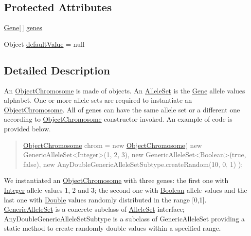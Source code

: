 \subsection*{Protected Attributes}
\begin{DoxyCompactItemize}
\item 
\hyperlink{classjenes_1_1chromosome_1_1_object_chromosome_1_1_gene}{Gene}\mbox{[}$\,$\mbox{]} \hyperlink{classjenes_1_1chromosome_1_1_object_chromosome_a33bb9e1cc526fe8e4be0417bbd05a127}{genes}
\item 
Object \hyperlink{classjenes_1_1chromosome_1_1_object_chromosome_af5e2ac0b5272d948ec566f824baa3411}{default\-Value} = null
\end{DoxyCompactItemize}


\subsection{Detailed Description}
An \hyperlink{classjenes_1_1chromosome_1_1_object_chromosome}{Object\-Chromosome} is made of objects. An \hyperlink{}{Allele\-Set} is the \hyperlink{classjenes_1_1chromosome_1_1_object_chromosome_1_1_gene}{Gene} allele values alphabet. One or more allele sets are required to instantiate an \hyperlink{classjenes_1_1chromosome_1_1_object_chromosome}{Object\-Chromosome}. All of genes can have the same allele set or a different one according to \hyperlink{classjenes_1_1chromosome_1_1_object_chromosome}{Object\-Chromosome} constructor invoked. An example of code is provided below. 

\begin{quotation}

\begin{DoxyPre}
\hyperlink{classjenes_1_1chromosome_1_1_object_chromosome}{ObjectChromosome} chrom = new \hyperlink{classjenes_1_1chromosome_1_1_object_chromosome}{ObjectChromosome}(
        new GenericAlleleSet<Integer>(1, 2, 3),
    new GenericAlleleSet<Boolean>(true, false),
        new AnyDoubleGenericAlleleSetSubtype.createRandom(10, 0, 1)  );
\end{DoxyPre}
\end{quotation}


We instantiated an \hyperlink{classjenes_1_1chromosome_1_1_object_chromosome}{Object\-Chromosome} with three genes\-: the first one with \hyperlink{}{Integer} allele values 1, 2 and 3; the second one with \hyperlink{}{Boolean} allele values and the last one with \hyperlink{}{Double} values randomly distributed in the range \mbox{[}0,1\mbox{]}. \hyperlink{}{Generic\-Allele\-Set} is a concrete subclass of \hyperlink{}{Allele\-Set} interface; Any\-Double\-Generic\-Allele\-Set\-Subtype is a subclass of Generic\-Allele\-Set providing a static method to create randomly double values within a specified range.

